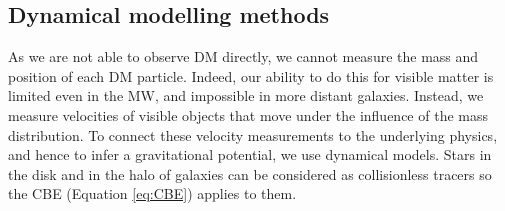 \subsection{Dynamical modelling methods}
As we are not able to observe \ac{DM} directly, we cannot measure the mass and position of each \ac{DM} particle. Indeed, our ability to do this for visible matter is limited even in the \ac{MW}, and impossible in more distant galaxies. Instead, we measure velocities of visible objects that move under the influence of the mass distribution. To connect these velocity measurements to the underlying physics, and hence to infer a gravitational potential, we use dynamical models. Stars in the disk and in the halo of galaxies can be considered as collisionless tracers so the \ac{CBE} (Equation \ref{eq:CBE})  applies to them.
